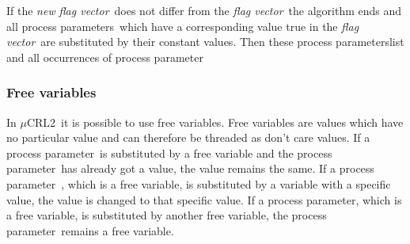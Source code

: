 \documentclass[a4paper,10pt]{article}
\newcommand{\mcrl}{$\mu$CRL2}
\newcommand{\pp}{process parameter}
\newcommand{\pps}{process parameters}
\newcommand{\ti}{\textit}
\newcommand{\fv}{\textit{flag vector}}
\begin{document}
If the \ti{new} \fv\ does not differ from the \fv\ the algorithm ends and all \pps\ which have a corresponding value true in the \fv\ are substituted by their constant values. Then these \pps list and all occurrences of \pp\ 

\subsubsection{Free variables}
In \mcrl\ it is possible to use free variables. Free variables are values which have no particular value and can therefore be threaded as don't care values. If a \pp\ is substituted by a free variable and the \pp\ has already got a value, the value remains the same. If a \pp\ , which is a free variable, is substituted by a variable with a specific value, the value is changed to that specific value. If a \pp , which is a free variable, is substituted by another free variable, the \pp\ remains a free variable. 
\end{document}
